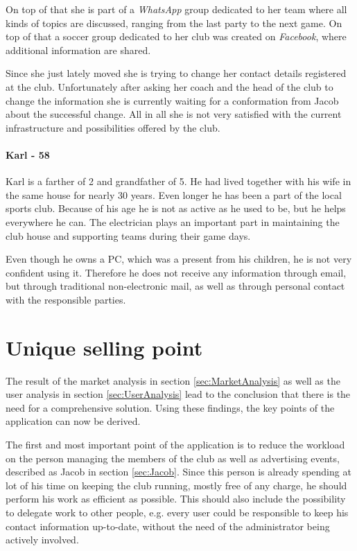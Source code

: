 On top of that she is part of a \emph{WhatsApp} group dedicated to her team where all kinds of topics are discussed, ranging from the last party to the next game. On top of that a soccer group dedicated to her club was created on \emph{Facebook}, where additional information are shared.

Since she just lately moved she is trying to change her contact details registered at the club. Unfortunately after asking her coach and the head of the club to change the information she is currently waiting for a conformation from Jacob about the successful change. All in all she is not very satisfied with the current infrastructure and possibilities offered by the club.

\subsubsection{Karl - 58}
Karl is a farther of 2 and grandfather of 5. He had lived together with his wife in the same house for nearly 30 years. Even longer he has been a part of the local sports club. Because of his age he is not as active as he used to be, but he helps everywhere he can. The electrician plays an important part in maintaining the club house and supporting teams during their game days.

Even though he owns a PC, which was a present from his children, he is not very confident using it. Therefore he does not receive any information through email, but through traditional non-electronic mail, as well as through personal contact with the responsible parties.  

\chapter{Unique selling point}
\label{chapter:SellingPoint}

The result of the market analysis in section \vref{sec:MarketAnalysis} as well as the user analysis in section \vref{sec:UserAnalysis} lead to the conclusion that there is the need for a comprehensive solution. Using these findings, the key points of the application can now be derived. 

The first and most important point of the application is to reduce the workload on the person managing the members of the club as well as advertising events, described as Jacob in section \vref{sec:Jacob}. Since this person is already spending at lot of his time on keeping the club running, mostly free of any charge, he should perform his work as efficient as possible. This should also include the possibility to delegate work to other people, e.g. every user could be responsible to keep his contact information up-to-date, without the need of the administrator being actively involved.

